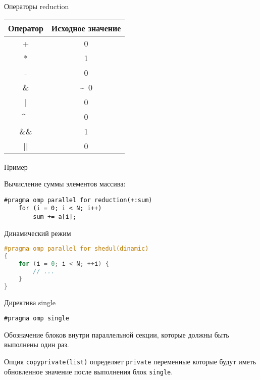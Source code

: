 \begin{frame}{Операторы reduction}
\begin{table}[htpb]
    \centering
    \begin{tabular}{|c|c|}
    \hline
    Оператор    &   Исходное значение   \\
    \hline
    +           &   0                   \\
    \hline
    *           &   1                   \\
    \hline
    -           &   0                   \\
    \hline
    \&          &   \~~0                \\
    \hline
    |           &   0                   \\
    \hline
    \^~         &   0                   \\
    \hline
    \&\&        &   1                   \\
    \hline
    ||          &   0                   \\
    \hline
    \end{tabular}
\end{table}
\end{frame}

\begin{frame}[fragile]{Пример}

Вычисление суммы элементов массива:

\begin{lstlisting}
#pragma omp parallel for reduction(+:sum)
    for (i = 0; i < N; i++)
        sum += a[i];
\end{lstlisting}

\end{frame}

\begin{frame}[fragile]{Динамический режим}

\begin{lstlisting}[language=C++,basicstyle=\ttfamily,keywordstyle=\color{blue},basicstyle=\scriptsize]
#pragma omp parallel for shedul(dinamic)
{
    for (i = 0; i < N; ++i) {
        // ...
    }
}
\end{lstlisting}

\end{frame}

\begin{frame}[fragile]{Директива single}

\begin{lstlisting}
#pragma omp single
\end{lstlisting}

Обозначение блоков внутри параллельной секции, которые должны быть выполнены
один раз.

\bigskip

\pause

Опция \texttt{copyprivate(list)} определяет \texttt{private} переменные которые
будут иметь обновленное значение после выполнения блок \texttt{single}.

\end{frame}

